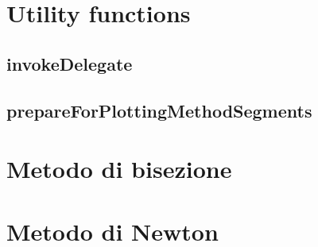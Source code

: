 \section{Utility functions}
\subsection{invokeDelegate}


\subsection{prepareForPlottingMethodSegments}


\section{Metodo di bisezione}
\label{sec:bisectionIterativeMethod}


\section{Metodo di Newton}
\label{sec:newtonIterativeMethod}


